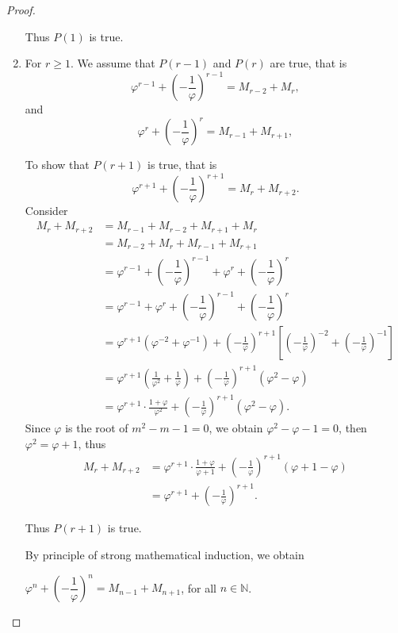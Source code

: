 \documentclass{rmutt-seminar}
\begin{document}
\begin{proof}
\begin{enumerate}[label=(\roman*),leftmargin = 1.5cm]
 
 Thus  $P(1)$ is true.
 
 \item For $r \geq 1$. We assume that $P(r-1)$ and $P(r)$ are true, that is
 \begin{equation*}
	\varphi^{r-1} + \left(-\dfrac{1}{\varphi}\right)^{r-1} = M_{r-2} + M_{r},  
\end{equation*}
and 
\begin{equation*}
	\varphi^{r} + \left(-\dfrac{1}{\varphi}\right)^{r} = M_{r-1} + M_{r+1},
\end{equation*}

To show that $P(r+1)$ is true, that is
$$ \varphi^{r+1} + \left(-\dfrac{1}{\varphi}\right)^{r+1}= M_{r} + M_{r+2}. $$  
 Consider
 \begin{align*}
	M_{r} + M_{r+2} &= M_{r-1} + M_{r-2} + M_{r+1} + M_r \\
	&= M_{r-2} + M_r + M_{r-1} + M_{r+1} \\
	&= \varphi^{r-1} + \left(-\dfrac{1}{\varphi}\right)^{r-1} +\varphi^{r} + \left(-\dfrac{1}{\varphi}\right)^{r} \\
	&= \varphi^{r-1} + \varphi^{r} + \left(-\dfrac{1}{\varphi}\right)^{r-1} + \left(-\dfrac{1}{\varphi}\right)^{r} \\
	&= \varphi^{r+1}(\varphi^{-2} + \varphi^{-1}) + \left(-\frac{1}{\varphi}\right)^{r+1} \left[ \left(-\frac{1}{\varphi}\right)^{-2} + \left(-\frac{1}{\varphi}\right)^{-1}\right] \\
	&= \varphi^{r+1} \left(\frac{1}{\varphi^2} + \frac{1}{\varphi}\right) + \left(-\frac{1}{\varphi}\right)^{r+1}(\varphi^2-\varphi) \\
	&= \varphi^{r+1} \cdot \frac{1+\varphi}{\varphi^2}+\left(-\frac{1}{\varphi}\right)^{r+1}(\varphi^2-\varphi).
\end{align*}
Since $\varphi$ is the root of $m^2 -m -1 =0$, we obtain $\varphi^2-\varphi-1=0$, then $\varphi^2 = \varphi + 1$, thus
 \begin{align*}
 M_{r} + M_{r+2} &= \varphi^{r+1} \cdot \frac{1+\varphi}{\varphi + 1}+\left(-\frac{1}{\varphi}\right)^{r+1}(\varphi + 1-\varphi)\\
 &= \varphi^{r+1}+\left(-\frac{1}{\varphi}\right)^{r+1}.
 \end{align*}	
 
 Thus $P(r+1)$ is true.
 
By principle of strong mathematical induction, we obtain 
\begin{center}
$\varphi^n + \left(-\dfrac{1}{\varphi}\right)^n = M_{n-1} + M_{n+1} $, for all $n \in \mathbb{N}$.
\end{center}
\end{enumerate}
\end{proof}
\end{document}
